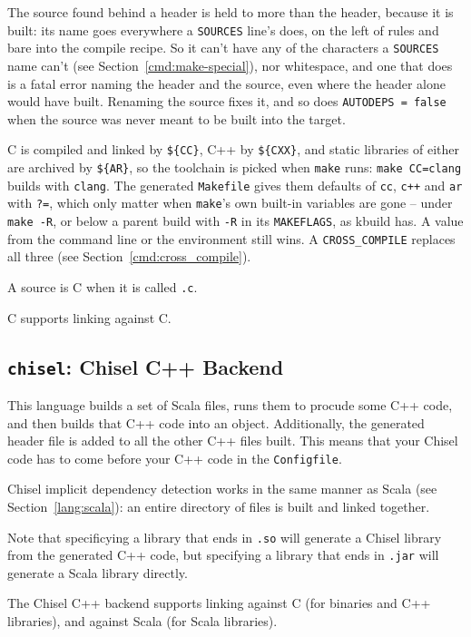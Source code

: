 \documentclass{article}
\begin{document}
The source found behind a header is held to more than the header,
because it is built: its name goes everywhere a \texttt{SOURCES}
line's does, on the left of rules and bare into the compile recipe.
So it can't have any of the characters a \texttt{SOURCES} name can't
(see Section~\ref{cmd:make-special}), nor whitespace, and one that
does is a fatal error naming the header and the source, even where the
header alone would have built.  Renaming the source fixes it, and so
does \texttt{AUTODEPS = false} when the source was never meant to be
built into the target.

C is compiled and linked by \texttt{\$\{CC\}}, C++ by
\texttt{\$\{CXX\}}, and static libraries of either are archived by
\texttt{\$\{AR\}}, so the toolchain is picked when \texttt{make}
runs: \texttt{make CC=clang} builds with \texttt{clang}.  The
generated \texttt{Makefile} gives them defaults of \texttt{cc},
\texttt{c++} and \texttt{ar} with \texttt{?=}, which only matter
when \texttt{make}'s own built-in variables are gone -- under
\texttt{make -R}, or below a parent build with \texttt{-R} in its
\texttt{MAKEFLAGS}, as kbuild has.  A value from the command line or
the environment still wins.  A \texttt{CROSS\_COMPILE} replaces all
three (see Section~\ref{cmd:cross_compile}).

A source is C when it is called \texttt{.c}.

C supports linking against C.

\subsection{\texttt{chisel}: Chisel C++ Backend \label{chisel}}

This language builds a set of Scala files, runs them to procude some
C++ code, and then builds that C++ code into an object.  Additionally,
the generated header file is added to all the other C++ files built.
This means that your Chisel code has to come before your C++ code in
the \texttt{Configfile}.

Chisel implicit dependency detection works in the same manner as Scala
(see Section~\ref{lang:scala}): an entire directory of files is built
and linked together.

Note that specificying a library that ends in \texttt{.so} will
generate a Chisel library from the generated C++ code, but specifying
a library that ends in \texttt{.jar} will generate a Scala library
directly.

The Chisel C++ backend supports linking against C (for binaries and
C++ libraries), and against Scala (for Scala libraries).
\end{document}
